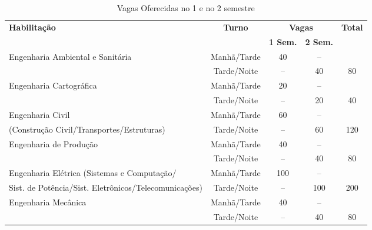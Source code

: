 \setlength{\tabcolsep}{5pt}
\begin{table}
\centering
\caption{Vagas Oferecidas no 1\textordmasculine{} e no 2\textordmasculine{} semestre}
\label{tabvagas}
\renewcommand{\arraystretch}{1.5}
  \begin{tabularx}{\textwidth}{|X|c|c|c|c|}
	\hline
	\multirow{2}{*}{\textbf{Habilitação}}& \multirow{2}{*}{\textbf{Turno}} & \multicolumn{2}{c|}{\textbf{Vagas}} & \multirow{2}{*}{\textbf{Total}}\\
	\cline{3-4}& & \textbf{1\textordmasculine{} Sem.}                     & \textbf{2\textordmasculine{} Sem.}                &     \\
		\hline
		Engenharia Ambiental e Sanitária & Manhã/Tarde & 40 & --&     \\
		                                 & Tarde/Noite & -- & 40 & 80 \\
		\hline
		Engenharia Cartográfica          & Manhã/Tarde & 20 & -- &    \\
		                                 & Tarde/Noite & -- & 20 & 40 \\
		\hline
		Engenharia Civil                 & Manhã/Tarde & 60 & -- &    \\
		(Construção Civil/Transportes/Estruturas) & Tarde/Noite & -- & 60 & 120 \\
		\hline
		Engenharia de Produção           & Manhã/Tarde & 40 & --&     \\
		                                 & Tarde/Noite & -- & 40 & 80  \\
		\hline
		Engenharia Elétrica (Sistemas e Computação/ & Manhã/Tarde& 100 & --  &     \\
		Sist. de Potência/Sist. Eletrônicos/Telecomunicações) & Tarde/Noite & -- & 100  & 200 \\
		\hline
		Engenharia Mecânica              & Manhã/Tarde & 40 & -- &     \\
		                                 & Tarde/Noite & -- & 40 & 80  \\
		\hline
	\end{tabularx}
\end{table}
